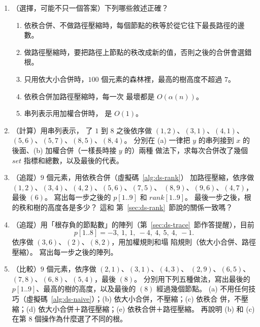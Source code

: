 \begin{enumerate}
\item （選擇，可能不只一個答案）下列哪些敘述正確？
\begin{enumerate}
\item 依秩合併、不做路徑壓縮時，每個節點的秩等於從它往下最長路徑的邊數。
\item 做路徑壓縮時，要把路徑上節點的秩改成新的值，否則之後的合併會選錯根。
\item 只用依大小合併時，$100$ 個元素的森林裡，最高的樹高度不超過 $7$。
\item 依秩合併加路徑壓縮時，每一次  最壞都是 $O(\alpha(n))$。
\item 串列表示用加權合併時， 是 $O(1)$。
\end{enumerate}

\item （計算）用串列表示， 了 $1$ 到 $8$ 之後依序做
$(1, 2)$、$(3, 1)$、$(4, 1)$、$(5, 6)$、$(5, 7)$、$(8, 5)$、$(8, 4)$。
分別在 (a) 一律把 $y$ 的串列接到 $x$ 的後面、(b) 加權合併（一樣長時接 $y$ 的）兩種
做法下，求每次合併改了幾個 $\mathit{set}$ 指標和總數，以及最後的代表。

\item \label{q:ds-rank-trace}（追蹤）$9$ 個元素，用依秩合併（虛擬碼~\ref{alg:ds-rank}）
加路徑壓縮，依序做 $(1, 2)$、$(3, 4)$、$(4, 2)$、$(5, 6)$、$(7, 5)$、
$(8, 9)$、$(9, 6)$、$(4, 7)$，最後 $(6)$。 寫出每一步之後的 $p[1..9]$
和 $\mathit{rank}[1..9]$。 最後一步之後，根的秩和樹的高度各是多少？ 這和
第~\ref{sec:ds-rank}~節說的關係一致嗎？

\item （追蹤）用「根存負的節點數」的陣列（第~\ref{sec:ds-trace}~節作答提醒），目前
\[
p[1..8] = -3,\ 1,\ 1,\ -4,\ 4,\ 5,\ 4,\ -1.
\]
依序做 $(3, 6)$、$(2)$、$(8, 2)$，用加權規則和塌
陷規則（依大小合併、路徑壓縮）。 寫出每一步之後的陣列。

\item \label{q:ds-compare}（比較）$9$ 個元素，依序做 $(2, 1)$、$(3, 1)$、$(4, 3)$、
$(2, 9)$、$(6, 5)$、$(7, 8)$、$(6, 8)$、$(5, 4)$，最後 $(8)$。
分別用下列五種做法，寫出最後的 $p[1..9]$、最高的樹的高度，以及最後的
$(8)$ 經過幾個節點。
(a) 不用任何技巧（虛擬碼~\ref{alg:ds-naive}）；(b) 依大小合併，不壓縮；(c) 依秩合
併，不壓縮；(d) 依大小合併＋路徑壓縮；(e) 依秩合併＋路徑壓縮。
再說明 (b) 和 (c) 在第 8 個操作為什麼選了不同的根。


\end{enumerate}
